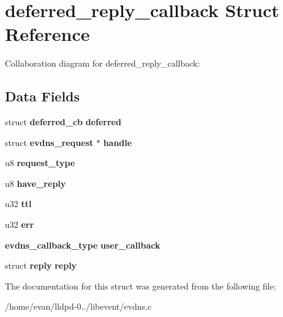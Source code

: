\section{deferred\-\_\-reply\-\_\-callback \-Struct \-Reference}
\label{structdeferred__reply__callback}


\-Collaboration diagram for deferred\-\_\-reply\-\_\-callback\-:
\subsection*{\-Data \-Fields}
\begin{DoxyCompactItemize}
\item 
struct {\bf deferred\-\_\-cb} {\bfseries deferred}\label{structdeferred__reply__callback_aebe8e3d0c896b175676d2a8ab6c9c725}

\item 
struct {\bf evdns\-\_\-request} $\ast$ {\bfseries handle}\label{structdeferred__reply__callback_aa0d67fca355c74d9fc9c5f87dc64b1ed}

\item 
u8 {\bfseries request\-\_\-type}\label{structdeferred__reply__callback_a364f25eba29acdf087603b287353679e}

\item 
u8 {\bfseries have\-\_\-reply}\label{structdeferred__reply__callback_a960affdd5f8c1d244804ee21271b4151}

\item 
u32 {\bfseries ttl}\label{structdeferred__reply__callback_a511010d89172749e7b39d0231fa0930c}

\item 
u32 {\bfseries err}\label{structdeferred__reply__callback_a8958fff24f728d622e5abd10914fe690}

\item 
{\bf evdns\-\_\-callback\-\_\-type} {\bfseries user\-\_\-callback}\label{structdeferred__reply__callback_a3c73b9b881ce36d9a4241033971633ff}

\item 
struct {\bf reply} {\bfseries reply}\label{structdeferred__reply__callback_ae3543c732d6c8aa08e29722485e1af03}

\end{DoxyCompactItemize}


\-The documentation for this struct was generated from the following file\-:\begin{DoxyCompactItemize}
\item 
/home/evan/lldpd-\/0../libevent/evdns.\-c\end{DoxyCompactItemize}
